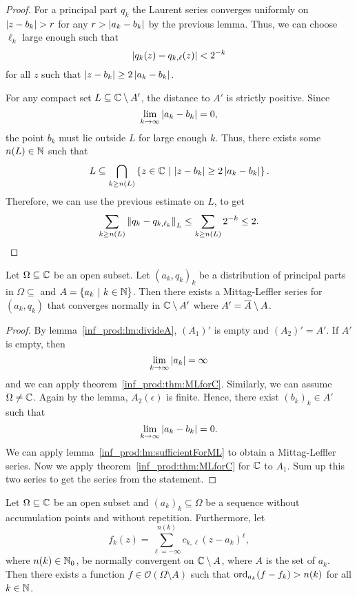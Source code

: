 \begin{proof}
For a principal part $q_k$ the Laurent series converges uniformly
on $\left\lvert z - b_k\right\rvert > r$ for any $r > \left\lvert a_k - b_k\right\rvert$ by the
previous lemma. Thus, we can choose $\ell_k$ large enough such that
\[
\left\lvert q_k(z) - q_{k, \ell}(z)\right\rvert < 2^{-k}
\]
for all $z$ such that $\left\lvert z - b_k\right\rvert \geq 2 \left\lvert a_k - b_k\right\rvert$.

For any compact set $L \subseteq \mathbb{C} \setminus A'$, the distance to
$A'$ is strictly positive. Since
\[
\lim_{k \to \infty} \left\lvert a_k - b_k\right\rvert = 0,
\]
the point $b_k$ must lie outside $L$ for large enough $k$. Thus,
there exists some $n(L) \in \mathbb{N}$ such that
\[
L \subseteq
\bigcap_{k \geq n(L)}
\left\{z \in \mathbb{C}~\middle\vert~\left\lvert z - b_k\right\rvert \geq 2 \left\lvert a_k - b_k\right\rvert\right\}.
\]
Therefore, we can use the previous estimate on $L$, to get 
\[
\sum_{k \geq n(L)} \left\lVert q_k - q_{k, \ell_k}\right\rVert_L \leq
\sum_{k \geq n(L)} 2^{- k} \leq
2. \qedhere
\]
\end{proof}

\begin{izrek}
\label{inf_prod:lm:MLTOpen}
Let $\Omega \subseteq \mathbb{C}$ be an open subset. Let $(a_k, q_k)_k$ be
a distribution of principal parts in $\Omega \subseteq$ and
$A = \left\{a_k~\middle\vert~k \in \mathbb{N}\right\}$. Then there exists a Mittag-Leffler
series for $(a_k, q_k)$ that converges normally in
$\mathbb{C} \setminus A'$ where $A' = \overline{A} \setminus A$.
\end{izrek}

\begin{proof}
By lemma~\ref{inf_prod:lm:divideA}, $(A_1)'$ is empty and
$(A_2)' = A'$. If $A'$ is empty, then
\[
\lim_{k \to \infty} \left\lvert a_k\right\rvert = \infty
\]
and we can apply theorem~\ref{inf_prod:thm:MLforC}. Similarly, we
can assume $\Omega \neq \mathbb{C}$. Again by the lemma, $A_2(\epsilon)$ is
finite. Hence, there exist $(b_k)_k \in A'$ such that
\[
\lim_{k \to \infty} \left\lvert a_k - b_k\right\rvert = 0.
\]
We can apply lemma~\ref{inf_prod:lm:sufficientForML} to obtain a
Mittag-Leffler series. Now we apply
theorem~\ref{inf_prod:thm:MLforC} for $\mathbb{C}$ to $A_1$. Sum up this
two series to get the series from the statement.
\end{proof}

\begin{izrek}
\label{inf_prod:thm:MLOsculation}
Let $\Omega \subseteq \mathbb{C}$ be an open subset and
$(a_k)_k \subseteq \Omega$ be a sequence without accumulation
points and without repetition. Furthermore, let
\[
f_k(z) =
\sum_{\ell=-\infty}^{n(k)} c_{k, \ell}(z - a_k)^\ell,
\]
where $n(k) \in \mathbb{N}_0$, be normally convergent on $\mathbb{C} \setminus A$,
where $A$ is the set of $a_k$. Then there exists a function
$f \in \mathcal{O}(\Omega \setminus A)$ such that
$\operatorname{ord}_{a_k}(f - f_k) > n(k)$ for all $k \in \mathbb{N}$.
\end{izrek}

